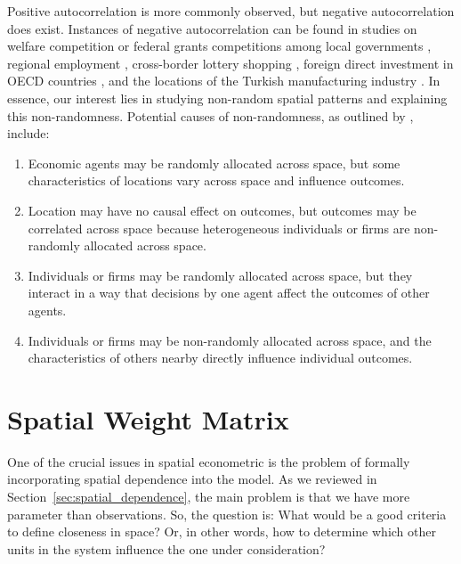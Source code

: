 \documentclass[english,12pt]{book}\usepackage[]{graphicx}\usepackage[]{xcolor}
\begin{document}
Positive autocorrelation is more commonly observed, but negative autocorrelation does exist. Instances of negative autocorrelation can be found in studies on welfare competition or federal grants competitions among local governments \citep{saavedra2000model, boarnet2002federal}, regional employment \citep{filiztekin2009regional, pavlyuk2011spatial}, cross-border lottery shopping \citep{garrett2002revenue}, foreign direct investment in OECD countries \citep{garretsen2009fdi}, and the locations of the Turkish manufacturing industry \citep{basdas2009spatial}. In essence, our interest lies in studying non-random spatial patterns and explaining this non-randomness. Potential causes of non-randomness, as outlined by \cite{gibbons2015spatial}, include:

\begin{enumerate}
    \item Economic agents may be randomly allocated across space, but some characteristics of locations vary across space and influence outcomes.
    \item Location may have no causal effect on outcomes, but outcomes may be correlated across space because heterogeneous individuals or firms are non-randomly allocated across space.
    \item Individuals or firms may be randomly allocated across space, but they interact in a way that decisions by one agent affect the outcomes of other agents.
    \item Individuals or firms may be non-randomly allocated across space, and the characteristics of others nearby directly influence individual outcomes.
\end{enumerate}

\section{Spatial Weight Matrix}

One of the crucial issues in spatial econometric is the problem of formally incorporating spatial dependence into the model. As we reviewed in Section~\ref{sec:spatial_dependence}, the main problem is that we have more parameter than observations. So, the question is: What would be a good criteria to define closeness in space? Or, in other words, how to determine which other units in the system influence the one under consideration?
\end{document}

